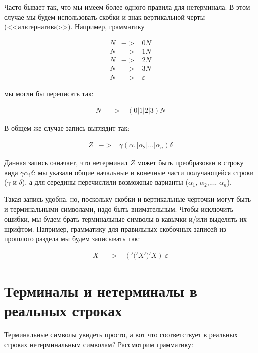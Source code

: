 \documentclass[12pt]{article}
\begin{document}
Часто бывает так, что мы имеем более одного правила для нетерминала. 
В этом случае мы будем использовать скобки и знак вертикальной черты (<<альтернатива>>).
Например, грамматику 
\begin{bnf}\begin{eqnarray*}
N &->& 0N\\
N &->& 1N\\
N &->& 2N\\
N &->& 3N\\
N &->& \varepsilon
\end{eqnarray*}\end{bnf}
мы могли бы переписать так:
\begin{bnf}\begin{eqnarray*}
N &->& (0|1|2|3) N
\end{eqnarray*}\end{bnf}

В общем же случае запись выглядит так:

\begin{bnf}\begin{eqnarray*}
Z &->& \gamma (\alpha_1 | \alpha_2 | \dots | \alpha_n) \delta
\end{eqnarray*}\end{bnf}

Данная запись означает, что нетерминал $Z$ может быть преобразован в строку
вида $\gamma\alpha_i\delta$: мы указали общие начальные и конечные 
части получающейся строки ($\gamma$ и $\delta$), а для середины перечислили возможные варианты
($\alpha_1$, $\alpha_2$,..., $\alpha_n$).

Такая запись удобна, но, поскольку скобки и вертикальные чёрточки могут быть и 
терминальными символами, надо быть внимательным.
Чтобы исключить ошибки, мы будем брать терминальные символы в кавычки и/или выделять 
их шрифтом. Например, грамматику для правильных скобочных записей из прошлого раздела 
мы будем записывать так:

\begin{bnf}\begin{eqnarray*}
X &->& ('\texttt{(}' X '\texttt{)}' X) | \varepsilon
\end{eqnarray*}\end{bnf}

\section{Терминалы и нетерминалы в реальных строках}
Терминальные символы увидеть просто, а вот что соответствует 
в реальных строках нетерминальным символам? Рассмотрим грамматику:
\end{document}
